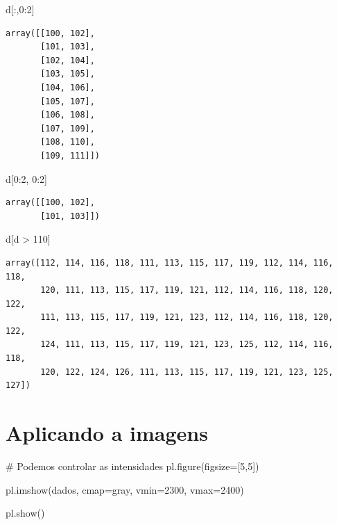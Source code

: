 \documentclass[
  letterpaper,
  DIV=11,
  numbers=noendperiod]{scrreprt}
\newenvironment{Shaded}{\begin{snugshade}}{\end{snugshade}}
\newcommand{\CommentTok}[1]{\textcolor[rgb]{0.37,0.37,0.37}{#1}}
\newcommand{\DecValTok}[1]{\textcolor[rgb]{0.68,0.00,0.00}{#1}}
\newcommand{\NormalTok}[1]{\textcolor[rgb]{0.00,0.23,0.31}{#1}}
\newcommand{\OperatorTok}[1]{\textcolor[rgb]{0.37,0.37,0.37}{#1}}
\newcommand{\StringTok}[1]{\textcolor[rgb]{0.13,0.47,0.30}{#1}}
\begin{document}
\begin{Shaded}
\begin{Highlighting}[]
\NormalTok{d[:,}\DecValTok{0}\NormalTok{:}\DecValTok{2}\NormalTok{]}
\end{Highlighting}
\end{Shaded}

\begin{verbatim}
array([[100, 102],
       [101, 103],
       [102, 104],
       [103, 105],
       [104, 106],
       [105, 107],
       [106, 108],
       [107, 109],
       [108, 110],
       [109, 111]])
\end{verbatim}

\begin{Shaded}
\begin{Highlighting}[]
\NormalTok{d[}\DecValTok{0}\NormalTok{:}\DecValTok{2}\NormalTok{, }\DecValTok{0}\NormalTok{:}\DecValTok{2}\NormalTok{]}
\end{Highlighting}
\end{Shaded}

\begin{verbatim}
array([[100, 102],
       [101, 103]])
\end{verbatim}

\begin{Shaded}
\begin{Highlighting}[]
\NormalTok{d[d }\OperatorTok{\textgreater{}} \DecValTok{110}\NormalTok{]}
\end{Highlighting}
\end{Shaded}

\begin{verbatim}
array([112, 114, 116, 118, 111, 113, 115, 117, 119, 112, 114, 116, 118,
       120, 111, 113, 115, 117, 119, 121, 112, 114, 116, 118, 120, 122,
       111, 113, 115, 117, 119, 121, 123, 112, 114, 116, 118, 120, 122,
       124, 111, 113, 115, 117, 119, 121, 123, 125, 112, 114, 116, 118,
       120, 122, 124, 126, 111, 113, 115, 117, 119, 121, 123, 125, 127])
\end{verbatim}

\chapter{Aplicando a imagens}\label{aplicando-a-imagens}

\begin{Shaded}
\begin{Highlighting}[]
\CommentTok{\# Podemos controlar as intensidades}
\NormalTok{pl.figure(figsize}\OperatorTok{=}\NormalTok{[}\DecValTok{5}\NormalTok{,}\DecValTok{5}\NormalTok{])}

\NormalTok{pl.imshow(dados, cmap}\OperatorTok{=}\StringTok{\textquotesingle{}gray\textquotesingle{}}\NormalTok{, vmin}\OperatorTok{=}\DecValTok{2300}\NormalTok{, vmax}\OperatorTok{=}\DecValTok{2400}\NormalTok{)}

\NormalTok{pl.show()}
\end{Highlighting}
\end{Shaded}
\end{document}
